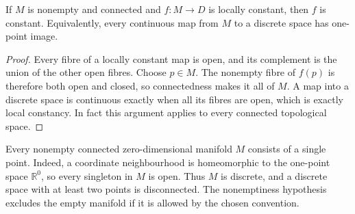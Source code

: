 \begin{corollary}
If $M$ is nonempty and connected and $f:M\to D$ is locally constant,
then $f$ is constant. Equivalently, every continuous map from $M$ to
a discrete space has one-point image.
\end{corollary}
\begin{proof}
Every fibre of a locally constant map is open, and its complement is
the union of the other open fibres. Choose $p\in M$. The nonempty
fibre of $f(p)$ is therefore both open and closed, so connectedness
makes it all of $M$. A map into a discrete space is continuous exactly
when all its fibres are open, which is exactly local constancy. In
fact this argument applies to every connected topological space.
\end{proof}

\begin{remark}
Every nonempty connected zero-dimensional manifold $M$ consists of a
single point. Indeed, a coordinate neighbourhood is homeomorphic to the
one-point space $\mathbb{R}^0$, so every singleton in $M$ is open. Thus $M$ is
discrete, and a discrete space with at least two points is disconnected.
The nonemptiness hypothesis excludes the empty manifold if it is allowed
by the chosen convention.
\end{remark}

